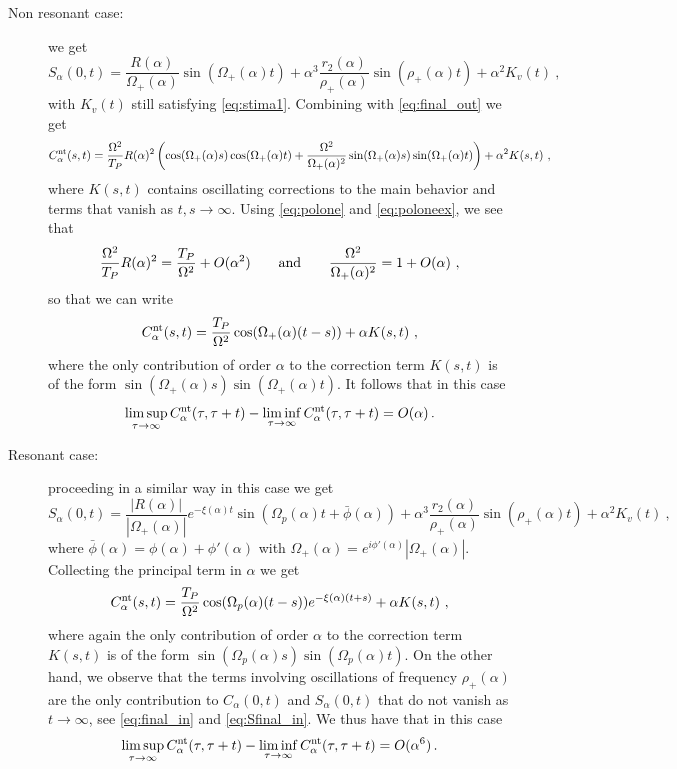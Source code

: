 \documentclass[11pt]{article}
\numberwithin{equation}{section}
\numberwithin{theorem}{section}
\begin{document}
\begin{description}
\item[Non resonant case:] we get
\begin{equation}\label{eq:Sfinal_in}
S_\alpha(0,t)=\frac{R(\alpha)}{\Omega_+(\alpha)}\sin(\Omega_+(\alpha)t)+ \alpha^3
\frac{r_2(\alpha)}{\rho_+(\alpha)}\sin(\rho_+(\alpha)t)+ \alpha^2
K_{v}(t)\ ,
\end{equation}
with $K_{v}(t)$ still satisfying \eqref{eq:stima1}. Combining with \eqref{eq:final_out} we get
\begin{equation*}
C^{\rm nt}_\alpha(s,t)=\frac{\Omega^2}{T_P}R(\alpha)^2\left(\cos(\Omega_+(\alpha)s)\cos(\Omega_+(\alpha)t)+
\frac{\Omega^2}{\Omega_+(\alpha)^2}\sin(\Omega_+(\alpha)s)\sin(\Omega_+(\alpha)t)\right)+
\alpha^2 K(s,t)\ ,
\end{equation*}
where $K(s,t)$ contains oscillating corrections to the main behavior and terms that vanish as $t,s\to\infty$. Using
\eqref{eq:polone} and \eqref{eq:poloneex}, we see that
\[
\frac{\Omega^2}{T_P}R(\alpha)^2=\frac{T_P}{\Omega^2}+O(\alpha^2)\qquad\hbox{and}\qquad 
\frac{\Omega^2}{\Omega_+(\alpha)^2}=1+O(\alpha)\ ,
\]
so that we can write
\begin{equation}\label{eq:Cntnr}
 C^{\rm nt}_\alpha(s,t)=\frac{T_P}{\Omega^2}\cos(\Omega_+(\alpha)(t-s))+
 \alpha K(s,t)\ ,
\end{equation}
where the only contribution of order $\alpha$ to the correction term $K(s,t)$ is of the form
$\sin(\Omega_+(\alpha)s)\sin(\Omega_+(\alpha)t)$. It follows that in this case
\[
\limsup_{\tau\to\infty}C^{\rm nt}_\alpha(\tau,\tau+t)- \liminf_{\tau\to\infty}C^{\rm 
nt}_\alpha(\tau,\tau+t)=O(\alpha)\, .
\]

\item[Resonant case:] proceeding in a similar way in this case we get
\[
S_\alpha(0,t)=\frac{|R(\alpha)|}{|\Omega_+(\alpha)|}e^{-\xi(\alpha)t}
\sin(\Omega_p(\alpha)t+\bar\phi(\alpha))+ 
\alpha^3
\frac{r_2(\alpha)}{\rho_+(\alpha)}\sin(\rho_+(\alpha)t)+ \alpha^2
K_{v}(t)\ ,
\]
where $\bar\phi(\alpha)=\phi(\alpha)+\phi'(\alpha)$ with $\Omega_+(\alpha)=e^{i\phi'(\alpha)}|\Omega_+(\alpha)|$. 
Collecting the principal term in $\alpha$ we get
\begin{equation}\label{eq:Cntr}
C^{\rm nt}_\alpha(s,t)=\frac{T_P}{\Omega^2}\cos(\Omega_p(\alpha)(t-s))e^{-\xi(\alpha)(t+s)}+
\alpha K(s,t)\ ,
\end{equation}
where again the only contribution of order $\alpha$ to the correction term $K(s,t)$ is of the form
$\sin(\Omega_p(\alpha)s)\sin(\Omega_p(\alpha)t)$. On the other hand, we observe that the terms involving oscillations of
frequency $\rho_+(\alpha)$ are the only contribution to $C_\alpha(0,t)$ and $S_\alpha(0,t)$ that do not vanish as
$t\to\infty$, see \eqref{eq:final_in} and \eqref{eq:Sfinal_in}. We thus have that in this case
\begin{equation}\label{eq:CtMark}
\limsup_{\tau\to\infty}C^{\rm nt}_\alpha(\tau,\tau+t)- \liminf_{\tau\to\infty}C^{\rm 
nt}_\alpha(\tau,\tau+t)=O(\alpha^6)\, .
\end{equation}

\end{description}
\end{document}
